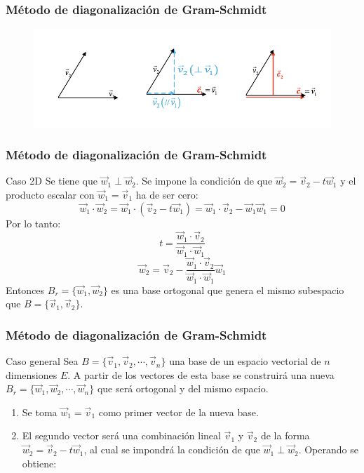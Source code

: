 \documentclass{beamer}
\begin{document}
\begin{frame}
  \frametitle{M\'etodo de diagonalizaci\'on de Gram-Schmidt}
\begin{figure}[h]
  \label{fig:esquema}
\centering
\includegraphics[width=\textwidth]{gram}
\end{figure}
\end{frame}

\begin{frame}
  \frametitle{M\'etodo de diagonalizaci\'on de Gram-Schmidt}
\begin{block}{Caso 2D}
Se tiene que $\vec w_1\perp\vec w_2$. Se impone la condici\'on de que $\vec w_2 = \vec v_2-t\vec w_1 $ y el producto escalar con $\vec w_1 = \vec v_1$ ha de ser cero:
\[\vec w_1\cdot \vec w_2 = \vec w_1\cdot (\vec v_2-t\vec w_1) = \vec w_1\cdot \vec v_2-\vec w_1\vec w_1 = 0 \]
Por lo tanto:
\[t = \frac{\vec w_1\cdot \vec v_2}{\vec w_1\cdot \vec w_1}\]
\[\vec w_2 = \vec v_2 - \frac{\vec w_1\cdot \vec v_2}{\vec w_1\cdot \vec w_1}\vec w_1\]
Entonces $B_r = \{\vec w_1,\vec w_2\}$ es una base ortogonal que genera el mismo subespacio que $B=\{\vec v_1, \vec v_2\}$.
\end{block}
\end{frame}


\begin{frame}
  \frametitle{M\'etodo de diagonalizaci\'on de Gram-Schmidt}
\begin{block}{Caso general}
Sea $B=\{\vec v_1,\vec v_2,\cdots, \vec v_n\}$ una base de un espacio vectorial de $n$ dimensiones $E$. A partir de los vectores de esta base se construir\'a una nueva $B_r=\{\vec w_1,\vec w_2,\cdots,\vec w_n\}$ que ser\'a ortogonal y del mismo espacio.
\begin{enumerate}
\item Se toma $\vec w_1 = \vec v_1$ como primer vector de la nueva base.
\item El segundo vector ser\'a una combinaci\'on lineal $\vec v_1$ y $\vec v_2$ de la forma $\vec w_2 = \vec v_2-t\vec w_1$, al cual se impondr\'a la condici\'on de que $\vec w_1\perp\vec w_2$. Operando se obtiene:
\end{enumerate}
\end{block}
\end{frame}
\end{document}
